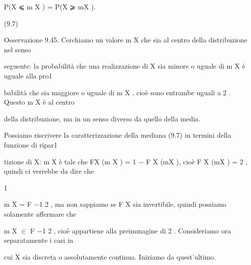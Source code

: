 \documentclass[a4paper,portrait,12pt]{article}
\begin{document}
\begin{flushleft}
P(X ⩽ m X ) = P(X ⩾ mX ).
\end{flushleft}





(9.7)





\begin{flushleft}
Osservazione 9.45. Cerchiamo un valore m X che sia al centro della distribuzione nel senso
\end{flushleft}


\begin{flushleft}
seguente: la probabilit\`{a} che una realizzazione di X sia minore o uguale di m X \`{e} uguale alla pro1
\end{flushleft}


\begin{flushleft}
babilit\`{a} che sia maggiore o uguale di m X , cio\`{e} sono entrambe uguali a 2 . Questo m X \`{e} al centro
\end{flushleft}


\begin{flushleft}
della distribuzione, ma in un senso diverso da quello della media.
\end{flushleft}


\begin{flushleft}
Possiamo riscrivere la caratterizzazione della mediana (9.7) in termini della funzione di ripar1
\end{flushleft}


\begin{flushleft}
tizione di X: m X \`{e} tale che FX (m X ) = 1 $-$ F X (mX ), cio\`{e} F X (mX ) = 2 , quindi ci verrebbe da dire che
\end{flushleft}


1


\begin{flushleft}
m X = F $-$1 2 , ma non sappiamo se F X sia invertibile, quindi possiamo solamente affermare che
\end{flushleft}





\begin{flushleft}
m X $\in$ F $-$1 2 , cio\`{e} appartiene alla preimmagine di 2 . Consideriamo ora separatamente i casi in
\end{flushleft}


\begin{flushleft}
cui X sia discreta o assolutamente continua. Iniziamo da quest'ultimo.
\end{flushleft}
\end{document}

